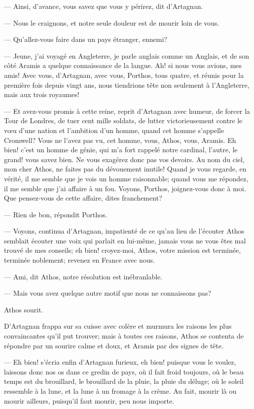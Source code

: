 — Ainsi, d'avance, vous savez que vous y périrez, dit d'Artagnan.

— Nous le craignons, et notre seule douleur est de mourir loin de vous.

— Qu'allez-vous faire dans un pays étranger, ennemi?

— Jeune, j'ai voyagé en Angleterre, je parle anglais comme un Anglais, et de son côté Aramis a quelque connaissance de la langue. Ah! si nous vous avions, mes amis! Avec vous, d'Artagnan, avec vous, Porthos, tous quatre, et réunis pour la première fois depuis vingt ans, nous tiendrions tête non seulement à l'Angleterre, mais aux trois royaumes!

— Et avez-vous promis à cette reine, reprit d'Artagnan avec humeur, de forcer la Tour de Londres, de tuer cent mille soldats, de lutter victorieusement contre le vœu d'une nation et l'ambition d'un homme, quand cet homme s'appelle Cromwell? Vous ne l'avez pas vu, cet homme, vous, Athos, vous, Aramis. Eh bien! c'est un homme de génie, qui m'a fort rappelé notre cardinal, l'autre, le grand! vous savez bien. Ne vous exagérez donc pas vos devoirs. Au nom du ciel, mon cher Athos, ne faites pas du dévouement inutile! Quand je vous regarde, en vérité, il me semble que je vois un homme raisonnable; quand vous me répondez, il me semble que j'ai affaire à un fou. Voyons, Porthos, joignez-vous donc à moi. Que pensez-vous de cette affaire, dites franchement?

— Rien de bon, répondit Porthos.

— Voyons, continua d'Artagnan, impatienté de ce qu'au lieu de l'écouter Athos semblait écouter une voix qui parlait en lui-même, jamais vous ne vous êtes mal trouvé de mes conseils; eh bien! croyez-moi, Athos, votre mission est terminée, terminée noblement; revenez en France avec nous.

— Ami, dit Athos, notre résolution est inébranlable.

— Mais vous avez quelque autre motif que nous ne connaissons pas?

Athos sourit.

D'Artagnan frappa sur sa cuisse avec colère et murmura les raisons les plus convaincantes qu'il put trouver; mais à toutes ces raisons, Athos se contenta de répondre par un sourire calme et doux, et Aramis par des signes de tête.

— Eh bien! s'écria enfin d'Artagnan furieux, eh bien! puisque vous le voulez, laissons donc nos os dans ce gredin de pays, où il fait froid toujours, où le beau temps est du brouillard, le brouillard de la pluie, la pluie du déluge; où le soleil ressemble à la lune, et la lune à un fromage à la crème. Au fait, mourir là ou mourir ailleurs, puisqu'il faut mourir, peu nous importe.

